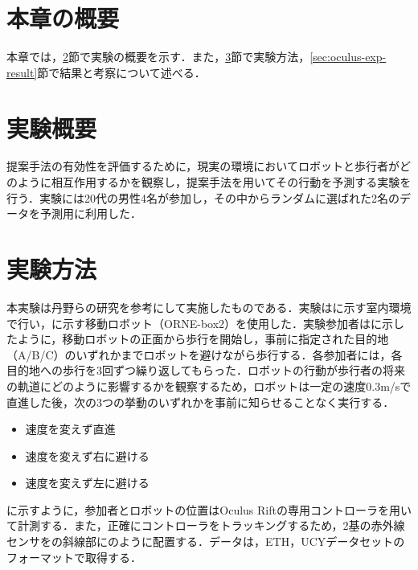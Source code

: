 

\section{本章の概要}
本章では，\ref{sec:oculus-exp-overview}節で実験の概要を示す．また，\ref{sec:oculus-exp-method}節で実験方法，\ref{sec:oculus-exp-result}節で結果と考察について述べる．

\section{実験概要}\label{sec:oculus-exp-overview}
提案手法の有効性を評価するために，現実の環境においてロボットと歩行者がどのように相互作用するかを観察し，提案手法を用いてその行動を予測する実験を行う．実験には20代の男性4名が参加し，その中からランダムに選ばれた2名のデータを予測用に利用した．

\section{実験方法}\label{sec:oculus-exp-method}
本実験は丹野らの研究\cite{si2023-tanno}を参考にして実施したものである．実験はに示す室内環境で行い，に示す移動ロボット（ORNE-box2\cite{井口颯人2023屋外自律移動ロボットプラットフォーム-orne}）を使用した．実験参加者はに示したように，移動ロボットの正面から歩行を開始し，事前に指定された目的地（A/B/C）のいずれかまでロボットを避けながら歩行する．各参加者には，各目的地への歩行を3回ずつ繰り返してもらった．ロボットの行動が歩行者の将来の軌道にどのように影響するかを観察するため，ロボットは一定の速度0.3m/sで直進した後，次の3つの挙動のいずれかを事前に知らせることなく実行する．

\begin{itemize}
  \item 速度を変えず直進
  \item 速度を変えず右に避ける
  \item 速度を変えず左に避ける
\end{itemize}

に示すように，参加者とロボットの位置はOculus Riftの専用コントローラを用いて計測する．また，正確にコントローラをトラッキングするため，2基の赤外線センサをの斜線部にのように配置する．データは，ETH\cite{pellegrini2009you-eth}，UCY\cite{lerner2007crowds-ucy}データセットのフォーマットで取得する．

